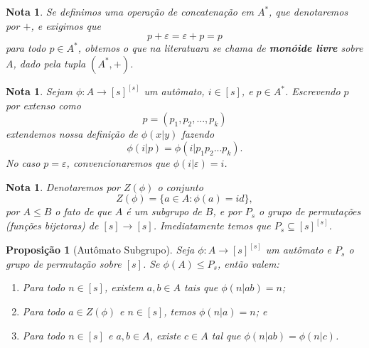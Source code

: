 \documentclass[11pt]{article}
\theoremstyle{plain}
\newtheorem{nota}[definicao]{Nota}
\newtheorem{proposicao}[definicao]{Proposição}
\theoremstyle{nonumberplain}
\newcommand{\set}[1]{\{#1\}}
\newcommand{\ainf}{A^*}
\newcommand{\funcset}[1]{#1^{#1}}
\newcommand{\automataAs}[1]{#1 : A \to \funcset{[s]}}
\begin{document}
\begin{nota}
    Se definimos uma operação de concatenação em $\ainf$, que denotaremos por $+$, e exigimos que \begin{equation}
        p + \varepsilon = \varepsilon + p = p
    \end{equation}
    para todo $p \in \ainf$, obtemos o que na literatuara se chama de \textbf{monóide livre} sobre $A$, dado pela tupla $(\ainf, +)$.
\end{nota}

\begin{nota}
    Sejam $\automataAs{\phi}$ um autômato, $i \in [s]$, e $p \in \ainf$. Escrevendo $p$ por extenso como \begin{equation}
        p = (p_1, p_2, ..., p_k)
    \end{equation}
    extendemos nossa definição de $\phi(x | y)$ fazendo \begin{equation}
        \phi(i | p) = \phi(i | p_1p_2...p_k).
    \end{equation}
    No caso $p = \varepsilon$, convencionaremos que $\phi(i | \varepsilon) = i$.
\end{nota}

\begin{nota}
    Denotaremos por $Z(\phi)$ o conjunto \begin{equation}
        Z(\phi) = \set{a \in A : \phi(a) = id},
    \end{equation}
    por $A \leq B$ o fato de que $A$ é um subgrupo de $B$, e por $P_s$ o grupo de permutações (funções bijetoras) de $[s] \to [s]$. Imediatamente temos que $P_s \subseteq \funcset{[s]}$.
\end{nota}

\begin{proposicao}[Autômato Subgrupo] \label{prop:automato_subgrupo}
    Seja $\automataAs{\phi}$ um autômato e $P_s$ o grupo de permutação sobre $[s]$. Se $\phi(A) \leq P_s$, então valem: \begin{enumerate}
        \item Para todo $n \in [s]$, existem $a, b \in A$ tais que $\phi(n | ab) = n$;
        \item Para todo $a \in Z(\phi)$ e $n \in [s]$, temos $\phi(n | a) = n$; e
        \item Para todo $n \in [s]$ e $a, b \in A$, existe $c \in A$ tal que $\phi(n | ab) = \phi(n | c)$.
    \end{enumerate}
\end{proposicao}
\end{document}
